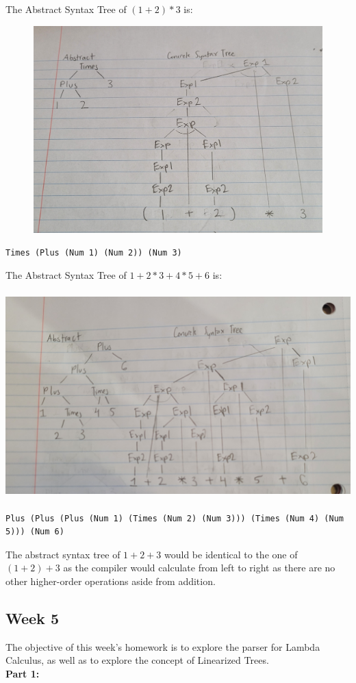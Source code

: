 \documentclass{article}
\theoremstyle{theorem}
\theoremstyle{definition}
\theoremstyle{remark}
\begin{document}
The Abstract Syntax Tree of $(1 + 2) * 3$ is:

\includegraphics[width=15cm, height=8cm]{Report Images/week4_4.jpg}
\begin{lstlisting}
Times (Plus (Num 1) (Num 2)) (Num 3)
\end{lstlisting}

The Abstract Syntax Tree of $1 + 2 * 3 + 4 * 5 + 6$ is:

\includegraphics[width=15cm, height=8cm]{Report Images/week4_5.jpg}
\begin{lstlisting}
Plus (Plus (Plus (Num 1) (Times (Num 2) (Num 3))) (Times (Num 4) (Num 5))) (Num 6)
\end{lstlisting}


The abstract syntax tree of $1+2+3$ would be identical to the one of $(1+2)+3$ as the compiler would calculate from left to right as there are no other higher-order operations aside from addition.

\subsection{Week 5}
The objective of this week's homework is to explore the parser for Lambda Calculus, as well as to explore the concept of Linearized Trees.\\
\textbf{Part 1:}
\end{document}
